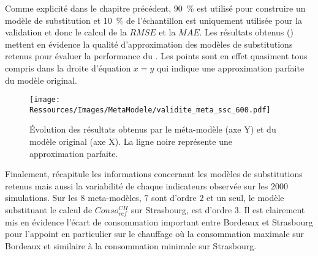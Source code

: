 Comme explicité dans le chapitre précédent,  \SI{90}{\percent} est utilisé pour construire un
modèle de substitution et \SI{10}{\percent} de l’échantillon est uniquement
utilisée pour la validation et donc le calcul de la $RMSE$ et la $MAE$.
Les résultats obtenus () mettent en évidence
la qualité d’approximation des modèles de substitutions retenus pour évaluer la
performance du . Les points sont en effet quasiment tous compris dans la
droite d’équation $x = y$ qui indique une approximation parfaite du modèle original.

\begin{figure}
    \centering
    \texttt{[image: Ressources/Images/MetaModele/validite\_meta\_ssc\_600.pdf]}
    \caption[Évaluation de la validité des méta-modèles du ]
            {Évolution des résultats obtenus par le méta-modèle (axe Y) et du modèle
             original (axe X). La ligne noire représente une approximation parfaite.}
    \label{fig:validite_meta_ssc}
\end{figure}

Finalement,  récapitule les informations concernant les modèles
de substitutions retenus mais aussi la variabilité de chaque indicateurs observée sur les
$2000$ simulations. Sur les $8$ meta-modèles, $7$ sont d’ordre $2$ et un seul, le modèle
substituant le calcul de $Conso_{ref}^{CH}$ sur Strasbourg, est d’ordre $3$. Il est
clairement mis en évidence l’écart de consommation important entre Bordeaux et Strasbourg
pour l’appoint en particulier sur le chauffage où la consommation maximale sur Bordeaux et
similaire à la consommation minimale sur Strasbourg.

